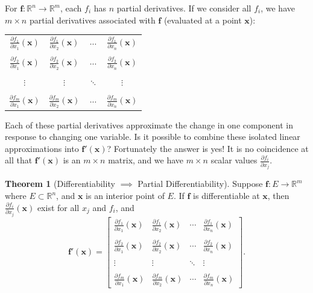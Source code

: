 \documentclass{article}
\newcommand{\R}{\mathbb{R}}
\newcommand{\x}{\mathbf{x}}
\newcommand{\f}{\mathbf{f}}
\theoremstyle{definition}
\newtheorem{theorem}{Theorem}[section]
\begin{document}
	For $ \f:\R^n\to\R^m $, each $ f_i $ has $ n $ partial derivatives. If we consider all $ f_i $, we have $ m\times n $ partial derivatives associated with $ \f $ (evaluated at a point $ \x $): 
	\begin{center}
		\begin{tabular}{ c c c c}
			$ \frac{\partial f_1}{\partial x_1}(\x)$& $ \frac{\partial f_1}{\partial x_2}(\x)$ & $\cdots $  & $ \frac{\partial f_1}{\partial x_n}(\x)$\\ \\
			$ \frac{\partial f_2}{\partial x_1}(\x)$& $ \frac{\partial f_2}{\partial x_2}(\x)$ & $\cdots $  & $ \frac{\partial f_2}{\partial x_n}(\x)$ \\  \\
			$\vdots$ & $\vdots$ & $\ddots$    & $\vdots$ \\ \\ 
			$ \frac{\partial f_m}{\partial x_1}(\x)$& $ \frac{\partial f_m}{\partial x_2}(\x)$ & $\cdots $  & $ \frac{\partial f_m}{\partial x_n}(\x)$ 
		\end{tabular}
	\end{center}
	Each of these partial derivatives approximate the change in one component in response to changing one variable. Is it possible to combine these isolated linear approximations into $ \f'(\x) $? Fortunately the answer is yes! It is no coincidence at all that $ \f'(\x) $ is an $ m\times n $ matrix, and we have $ m\times n $ scalar values $ \frac{\partial f_i}{\partial x_j} $. 
	\begin{theorem}[Differentiability $ \implies $ Partial Differentiability]
		Suppose $ \f:E\to\R^m $ where $ E\subset \R^n $, and $ \mathbf x $ is an interior point of $ E $. If $ \f $ is differentiable at $ \x $, then $ \frac{\partial f_i}{\partial x_j}(\x) $ exist for all $ x_j $ and $ f_i $, and 
		$$\f'(\x) = \begin{bmatrix}
			\frac{\partial f_1}{\partial x_1}(\x) &   \frac{\partial f_1}{\partial x_2}(\x)  &  \cdots    &   \frac{\partial f_1}{\partial x_n}(\x) \\ \\
			\frac{\partial f_2}{\partial x_1}(\x) &   \frac{\partial f_2}{\partial x_2}(\x)  &  \cdots    &   \frac{\partial f_2}{\partial x_n}(\x)  \\  \\
			\vdots  &  \vdots  &  \ddots     &  \vdots  \\ \\ 
			\frac{\partial f_m}{\partial x_1}(\x) &   \frac{\partial f_m}{\partial x_2}(\x)  &  \cdots    &   \frac{\partial f_m}{\partial x_n}(\x)  
		\end{bmatrix} .$$
	\end{theorem}
\end{document}
